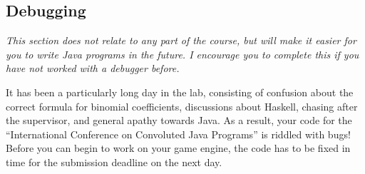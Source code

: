 \documentclass[10pt,a4paper,fleqn]{exam}
\begin{document}
\begin{questions}

\section{Debugging}

\question \emph{This section does not relate to any part of the course, but will make it easier for you to write Java programs in the future. I encourage you to complete this if you have not worked with a debugger before.}

It has been a particularly long day in the lab, consisting of confusion about the correct formula for binomial coefficients, discussions about Haskell, chasing after the supervisor, and general apathy towards Java. As a result, your code for the ``International Conference on Convoluted Java Programs'' is riddled with bugs! Before you can begin to work on your game engine, the code has to be fixed in time for the submission deadline on the next day. 
\end{questions}
\end{document}
